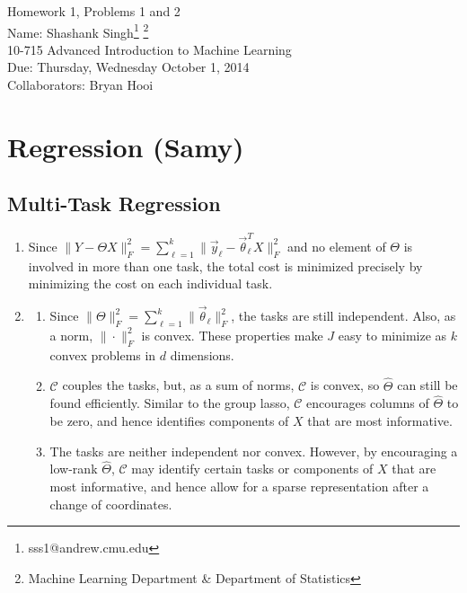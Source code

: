 \documentclass[11pt]{article}
\makeatletter
\newcommand{\myname}{Shashank Singh\footnote{sss1@andrew.cmu.edu}
        \footnote{Machine Learning Department \& Department of Statistics}}
\newcommand{\myclass}{10-715 Advanced Introduction to Machine Learning}
\newcommand{\myhwnum}{1}
\newcommand{\duedate}{Thursday, Wednesday October 1, 2014}
\newcommand{\C}{\mathcal{C}} %
\makeatother
\begin{document}
\thispagestyle{plain}

{\Large Homework \myhwnum, Problems 1 and 2} \\
Name: \myname \\
\myclass \\
Due: \duedate \\
Collaborators: Bryan Hooi

\section{Regression (Samy)}
\subsection{Multi-Task Regression}
\begin{enumerate}
\item Since
$\|Y - \Theta X\|_F^2
    = \sum_{\ell = 1}^k \|\vec y_\ell - \vec \theta_\ell^T X\|_F^2$ and no
element of $\Theta$ is involved in more than one task, the total cost is
minimized precisely by minimizing the cost on each individual task.
\item
\begin{enumerate}
\item Since $\|\Theta\|_F^2 = \sum_{\ell = 1}^k \|\vec\theta_\ell\|_F^2$, the
tasks are still independent. Also, as a norm, $\|\cdot\|_F^2$ is convex. These
properties make $J$ easy to minimize as $k$ convex problems in $d$ dimensions.
\item $\C$ couples the tasks, but, as a sum of norms, $\C$ is convex, so
$\hat \Theta$ can still be found efficiently. Similar to the group lasso, $\C$
encourages columns of $\hat \Theta$ to be zero, and hence identifies components
of $X$ that are most informative.
\item The tasks are neither independent nor convex. However, by encouraging a
low-rank $\hat\Theta$, $\C$ may identify certain tasks or components of $X$
that are most informative, and hence allow for a sparse representation after a
change of coordinates.
\end{enumerate}
\end{enumerate}
\end{document}
